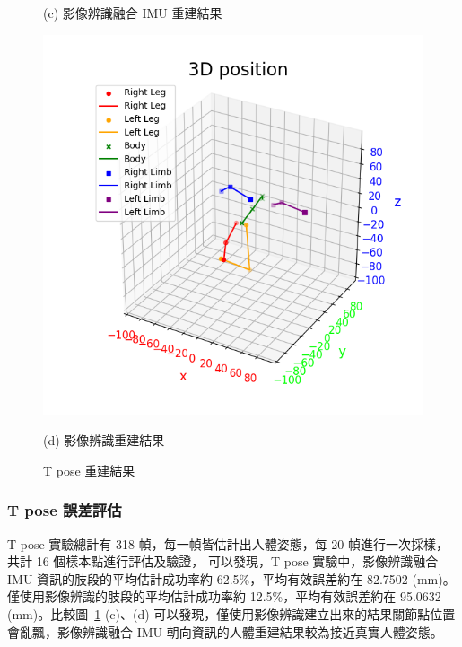 \begin{figure}[!ht]
\begin{minipage}{.5\textwidth}
      \caption*{(c) 影像辨識融合 IMU 重建結果}
   \end{minipage}%
   \begin{minipage}{.5\textwidth}
      \centering
      \includegraphics[width=.95\linewidth]{figure/ch4_fig_tpose_result_no2.png}
      \caption*{(d) 影像辨識重建結果}
   \end{minipage}
   \caption[T pose 重建結果]{T pose 重建結果}
   \label{ch4_fig_Tpose}
\end{figure}

\subsubsection*{T pose 誤差評估}
T pose 實驗總計有 318 幀，每一幀皆估計出人體姿態，每 20 幀進行一次採樣，共計 16 個樣本點進行評估及驗證，
可以發現，T pose 實驗中，影像辨識融合 IMU 資訊的肢段的平均估計成功率約 62.5\%，平均有效誤差約在 82.7502 (mm)。僅使用影像辨識的肢段的平均估計成功率約 12.5\%，平均有效誤差約在 95.0632 (mm)。比較圖~\ref{ch4_fig_Tpose} (c)、(d) 可以發現，僅使用影像辨識建立出來的結果關節點位置會亂飄，影像辨識融合 IMU 朝向資訊的人體重建結果較為接近真實人體姿態。

